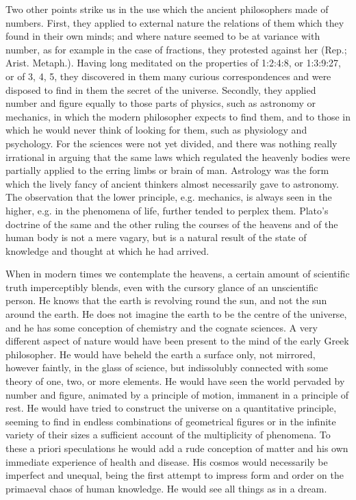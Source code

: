 \documentclass[11pt,letter]{article}
\begin{document}
\par  Two other points strike us in the use which the ancient philosophers made of numbers. First, they applied to external nature the relations of them which they found in their own minds; and where nature seemed to be at variance with number, as for example in the case of fractions, they protested against her (Rep.; Arist. Metaph.). Having long meditated on the properties of 1:2:4:8, or 1:3:9:27, or of 3, 4, 5, they discovered in them many curious correspondences and were disposed to find in them the secret of the universe. Secondly, they applied number and figure equally to those parts of physics, such as astronomy or mechanics, in which the modern philosopher expects to find them, and to those in which he would never think of looking for them, such as physiology and psychology. For the sciences were not yet divided, and there was nothing really irrational in arguing that the same laws which regulated the heavenly bodies were partially applied to the erring limbs or brain of man. Astrology was the form which the lively fancy of ancient thinkers almost necessarily gave to astronomy. The observation that the lower principle, e.g. mechanics, is always seen in the higher, e.g. in the phenomena of life, further tended to perplex them. Plato’s doctrine of the same and the other ruling the courses of the heavens and of the human body is not a mere vagary, but is a natural result of the state of knowledge and thought at which he had arrived.

\par  When in modern times we contemplate the heavens, a certain amount of scientific truth imperceptibly blends, even with the cursory glance of an unscientific person. He knows that the earth is revolving round the sun, and not the sun around the earth. He does not imagine the earth to be the centre of the universe, and he has some conception of chemistry and the cognate sciences. A very different aspect of nature would have been present to the mind of the early Greek philosopher. He would have beheld the earth a surface only, not mirrored, however faintly, in the glass of science, but indissolubly connected with some theory of one, two, or more elements. He would have seen the world pervaded by number and figure, animated by a principle of motion, immanent in a principle of rest. He would have tried to construct the universe on a quantitative principle, seeming to find in endless combinations of geometrical figures or in the infinite variety of their sizes a sufficient account of the multiplicity of phenomena. To these a priori speculations he would add a rude conception of matter and his own immediate experience of health and disease. His cosmos would necessarily be imperfect and unequal, being the first attempt to impress form and order on the primaeval chaos of human knowledge. He would see all things as in a dream.
\end{document}
